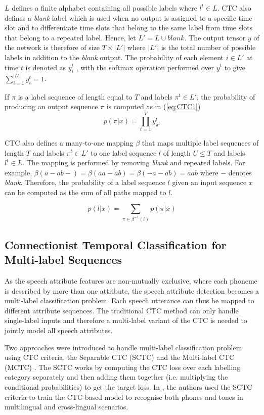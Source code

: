 \documentclass[12pt]{elsarticle}
\begin{document}
$L$ defines a finite alphabet containing all possible labels where $l^t \in L$. CTC also defines a \emph{blank} label which is used when no output is assigned to a specific time slot and to differentiate time slots that belong to the same label from time slots that belong to a repeated label. Hence, let $L'=L \cup {blank}$. The output tensor $y$ of the network is therefore of size $T \times |L'|$ where $|L'|$ is the total number of possible labels in addition to the \emph{blank} output. The probability of each element $i \in L'$ at time $t$ is denoted as $y_i^t$ , with the softmax operation performed over $y^t$ to give $\sum _{i=1}^{|L'|}y_i^t=1$. 

 If $\pi$ is a label sequence of length equal to $T$ and labels $\pi^{t} \in L'$, the probability of producing an output sequence $\pi$ is computed as in (\ref{eq:CTC1})
 \begin{equation}
    \label{eq:CTC1}
     p(\pi|x)=\prod_{t=1}^T y_{\pi^t}^{t}
 \end{equation}

CTC also defines a many-to-one mapping $\beta$  that maps multiple label sequences of length $T$ and labels $\pi^t \in L'$ to one label sequence $l$ of length $U \le T$ and labels $l^t \in L$. The mapping is performed by removing \emph{blank} and repeated labels. For example, $\beta(a-ab-)=\beta(aa-ab)=\beta(-a-ab)=aab$ where $-$ denotes \emph{blank}. Therefore, the probability of a label sequence $l$ given an input sequence $x$ can be computed as the sum of all paths mapped to $l$. 

\begin{equation}
    \label{eq:CTC2}
    p(l|x)=\sum_{\pi \in \beta^{-1}(l)} p(\pi|x)
\end{equation}

\subsection{Connectionist Temporal Classification for Multi-label Sequences}
As the speech attribute features are non-mutually exclusive, where each phoneme is described by more than one attribute, the speech attribute detection becomes a multi-label classification problem. Each speech utterance can thus be mapped to different attribute sequences. The traditional CTC method can only handle single-label inputs and therefore a multi-label variant of the CTC is needed to jointly model all speech attributes.

Two approaches were introduced to handle multi-label classification problem using CTC criteria, the Separable CTC (SCTC) and the Multi-label CTC (MCTC) \cite{RN281}. The SCTC works by computing the CTC loss over each labelling category separately and then adding them together (i.e. multiplying the conditional probabilities) to get the target loss. In \cite{RN283}, the authors used the SCTC criteria to train the CTC-based model to recognise both phones and tones in multilingual and cross-lingual scenarios.
\end{document}
